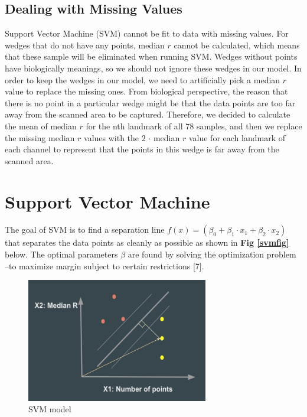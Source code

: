 \documentclass[10pt,letterpaper]{article}
\begin{document}
\subsection{Dealing with Missing
Values}\label{dealing-with-missing-values}

Support Vector Machine (SVM) cannot be fit to data with missing values.
For wedges that do not have any points, median \(r\) cannot be
calculated, which means that these sample will be eliminated when
running SVM. Wedges without points have biologically meanings, so we
should not ignore these wedges in our model. In order to keep the wedges
in our model, we need to artificially pick a median \(r\) value to
replace the missing ones. From biological perspective, the reason that
there is no point in a particular wedge might be that the data points
are too far away from the scanned area to be captured. Therefore, we
decided to calculate the mean of median \(r\) for the nth landmark of
all 78 samples, and then we replace the missing median \(r\) values with
the \(2\) \(\cdot\) median \(r\) value for each landmark of each channel
to represent that the points in this wedge is far away from the scanned
area.

\section{Support Vector Machine}\label{support-vector-machine-1}

The goal of SVM is to find a separation line
\(f(x) = (\beta_0 + \beta_1 \cdot x_1 + \beta_2 \cdot x_2)\) that
separates the data points as cleanly as possible as shown in \textbf{Fig
\ref{svmfig}} below. The optimal parameters \(\beta\) are found by
solving the optimization problem --to maximize margin subject to certain
restrictions {[}7{]}.

\begin{figure}[h]
\includegraphics[width=3.12in]{figures/svm_fig} \caption{\label{svmfig} SVM model}\label{fig:unnamed-chunk-3}
\end{figure}
\end{document}
